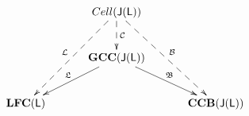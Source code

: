 \[
\xymatrixrowsep{0.35in}
\xymatrixcolsep{0.45in}
\xymatrix{
& & Cell(\sJ(\sL)) \ar@{-->}[d]^{\cC} \ar@{-->}[ddl]_{\cL} \ar@{-->}[ddr]^{\cB} & &  \\
& & {\bf GCC}(\sJ(\sL)) \ar[dl]_{\mathfrak{L}} \ar[dr]^{\mathfrak{B}} & &  \\
&\bCF(\sL)  & &  {\bf CCB(\sJ(\sL))}&
}
\]


%
%



%











